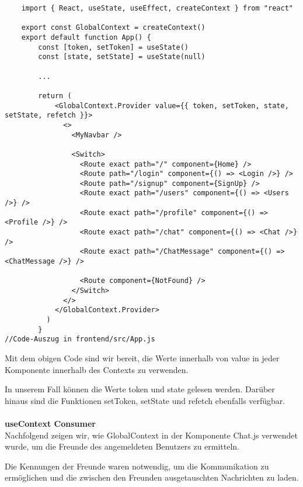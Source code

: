  \begin{lstlisting}
    import { React, useState, useEffect, createContext } from "react"

    export const GlobalContext = createContext()
    export default function App() {
        const [token, setToken] = useState()
        const [state, setState] = useState(null)
        
        ...
   
        return (
            <GlobalContext.Provider value={{ token, setToken, state, setState, refetch }}>
              <>
                <MyNavbar />
        
                <Switch>
                  <Route exact path="/" component={Home} />
                  <Route path="/login" component={() => <Login />} />
                  <Route path="/signup" component={SignUp} />
                  <Route exact path="/users" component={() => <Users />} />
                  <Route exact path="/profile" component={() => <Profile />} />
                  <Route exact path="/chat" component={() => <Chat />} />
                  <Route exact path="/ChatMessage" component={() => <ChatMessage />} />
        
                  <Route component={NotFound} />
                </Switch>
              </>
            </GlobalContext.Provider>
          )
        }
//Code-Auszug in frontend/src/App.js
 \end{lstlisting}
 Mit dem obigen Code sind wir bereit, die Werte innerhalb von value in jeder Komponente innerhalb des Contexts zu verwenden.

 In unserem Fall können die Werte token und state gelesen werden. Darüber hinaus sind die Funktionen setToken, setState und refetch ebenfalls verfügbar.
\\\\
\textbf{useContext Consumer} \\
Nachfolgend zeigen wir, wie GlobalContext in der Komponente Chat.js verwendet wurde, um die Freunde des angemeldeten Benutzers zu ermitteln.

Die Kennungen der Freunde waren notwendig, um die Kommunikation zu ermöglichen und die zwischen den Freunden ausgetauschten Nachrichten zu laden.

